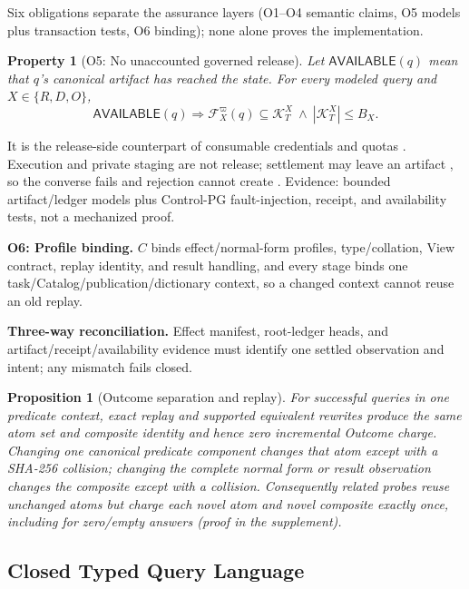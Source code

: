 \documentclass[10pt,journal,compsoc]{IEEEtran}
\newcommand{\code}[1]{\texttt{\detokenize{#1}}}
\newcommand{\facts}{\mathcal{F}}
\newcommand{\accounted}{\mathcal{K}}
\newtheorem{property}{Property}
\newtheorem{proposition}{Proposition}
\begin{document}
Six obligations separate the assurance layers (O1--O4 semantic claims, O5
models plus transaction tests, O6 binding); none alone proves the
implementation.

\begin{property}[O5: No unaccounted governed release]
\label{prop:no-unaccounted-release}
Let $\mathsf{AVAILABLE}(q)$ mean that $q$'s canonical artifact has reached the
\code{AVAILABLE} state. For every modeled query and $X\in\{R,D,O\}$,
\[
 \mathsf{AVAILABLE}(q)\Longrightarrow
 \facts_X^\varpi(q)\subseteq\accounted_T^X
 \ \wedge\ |\accounted_T^X|\leq B_X.
\]
\end{property}
It is the release-side counterpart of consumable credentials and quotas
\cite{bowers2007consumable,pollack2007quota}.
Execution and private staging are not release; settlement may leave an
artifact \code{PENDING}, so the converse fails and rejection cannot
create \code{AVAILABLE}. Evidence: bounded artifact/ledger models plus
Control-PG fault-injection, receipt, and availability tests, not a
mechanized proof.

\textbf{O6: Profile binding.} $C$ binds effect/normal-form profiles,
type/collation, View contract, replay identity, and result handling, and
every stage binds one task/Catalog/publication/dictionary context, so a
changed context cannot reuse an old replay.

\textbf{Three-way reconciliation.} Effect manifest, root-ledger heads,
and artifact/receipt/availability evidence must identify one settled
observation and intent; any mismatch fails closed.

\begin{proposition}[Outcome separation and replay]
\label{thm:outcome-separation}
For successful queries in one predicate context, exact replay and supported
equivalent rewrites produce the same atom set and composite identity and hence
zero incremental Outcome charge. Changing one canonical predicate component
changes that atom except with a SHA-256 collision; changing the complete normal
form or result observation changes the composite except with a collision.
Consequently related probes reuse unchanged atoms but charge each novel atom
and novel composite exactly once, including for zero/empty answers (proof in
the supplement).
\end{proposition}

\subsection{Closed Typed Query Language}
\end{document}
